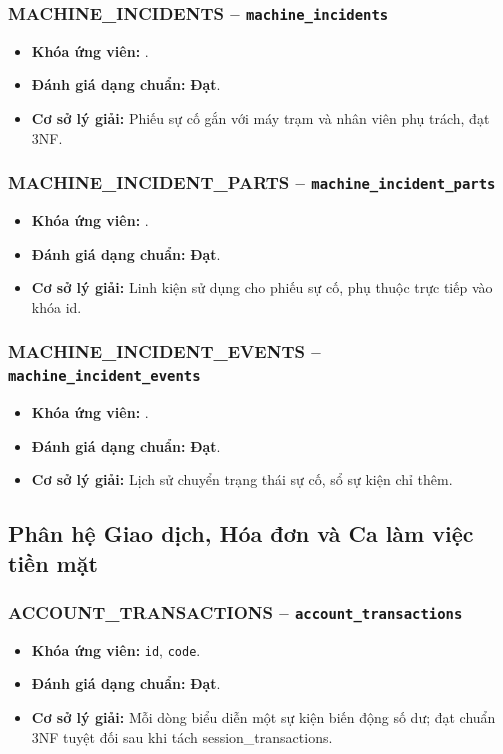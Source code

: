 \subsubsection{MACHINE_INCIDENTS -- \texttt{machine\_incidents}}
\begin{itemize}
  \item \textbf{Khóa ứng viên:} \texttt{}.
  \item \textbf{Đánh giá dạng chuẩn:} \textbf{Đạt}.
  \item \textbf{Cơ sở lý giải:} Phiếu sự cố gắn với máy trạm và nhân viên phụ trách, đạt 3NF.
\end{itemize}

\subsubsection{MACHINE_INCIDENT_PARTS -- \texttt{machine\_incident\_parts}}
\begin{itemize}
  \item \textbf{Khóa ứng viên:} \texttt{}.
  \item \textbf{Đánh giá dạng chuẩn:} \textbf{Đạt}.
  \item \textbf{Cơ sở lý giải:} Linh kiện sử dụng cho phiếu sự cố, phụ thuộc trực tiếp vào khóa id.
\end{itemize}

\subsubsection{MACHINE_INCIDENT_EVENTS -- \texttt{machine\_incident\_events}}
\begin{itemize}
  \item \textbf{Khóa ứng viên:} \texttt{}.
  \item \textbf{Đánh giá dạng chuẩn:} \textbf{Đạt}.
  \item \textbf{Cơ sở lý giải:} Lịch sử chuyển trạng thái sự cố, sổ sự kiện chỉ thêm.
\end{itemize}

\subsection{Phân hệ Giao dịch, Hóa đơn và Ca làm việc tiền mặt}
\subsubsection{ACCOUNT_TRANSACTIONS -- \texttt{account\_transactions}}
\begin{itemize}
  \item \textbf{Khóa ứng viên:} \texttt{id}, \texttt{code}.
  \item \textbf{Đánh giá dạng chuẩn:} \textbf{Đạt}.
  \item \textbf{Cơ sở lý giải:} Mỗi dòng biểu diễn một sự kiện biến động số dư; đạt chuẩn 3NF tuyệt đối sau khi tách session_transactions.
\end{itemize}

